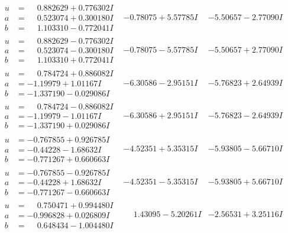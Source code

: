 \documentclass[1p]{elsarticle_modified}
\theoremstyle{definition}
\begin{document}
$$\begin{array}{c|c|c}
\begin{aligned}
u &= \phantom{-}0.882629 + 0.776302 I \\
a &= \phantom{-}0.523074 + 0.300180 I \\
b &= \phantom{-}1.103310 - 0.772041 I\end{aligned}
 & -0.78075 + 5.57785 I & -5.50657 - 2.77090 I \\ \hline\begin{aligned}
u &= \phantom{-}0.882629 - 0.776302 I \\
a &= \phantom{-}0.523074 - 0.300180 I \\
b &= \phantom{-}1.103310 + 0.772041 I\end{aligned}
 & -0.78075 - 5.57785 I & -5.50657 + 2.77090 I \\ \hline\begin{aligned}
u &= \phantom{-}0.784724 + 0.886082 I \\
a &= -1.19979 + 1.01167 I \\
b &= -1.337190 - 0.029086 I\end{aligned}
 & -6.30586 - 2.95151 I & -5.76823 + 2.64939 I \\ \hline\begin{aligned}
u &= \phantom{-}0.784724 - 0.886082 I \\
a &= -1.19979 - 1.01167 I \\
b &= -1.337190 + 0.029086 I\end{aligned}
 & -6.30586 + 2.95151 I & -5.76823 - 2.64939 I \\ \hline\begin{aligned}
u &= -0.767855 + 0.926785 I \\
a &= -0.44228 - 1.68632 I \\
b &= -0.771267 + 0.660663 I\end{aligned}
 & -4.52351 + 5.35315 I & -5.93805 - 5.66710 I \\ \hline\begin{aligned}
u &= -0.767855 - 0.926785 I \\
a &= -0.44228 + 1.68632 I \\
b &= -0.771267 - 0.660663 I\end{aligned}
 & -4.52351 - 5.35315 I & -5.93805 + 5.66710 I \\ \hline\begin{aligned}
u &= \phantom{-}0.750471 + 0.994480 I \\
a &= -0.996828 + 0.026809 I \\
b &= \phantom{-}0.648434 - 1.004480 I\end{aligned}
 & \phantom{-}1.43095 - 5.20261 I & -2.56531 + 3.25116 I \\ \hline\begin{aligned}

\end{aligned}
\end{array}$$
\end{document}

